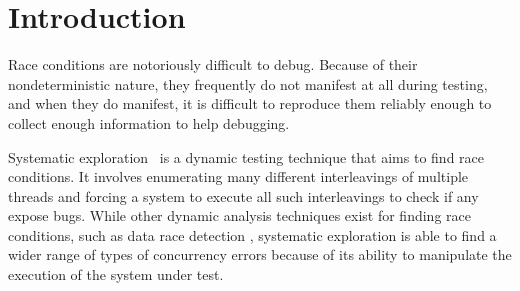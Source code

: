 \documentclass{llncs}
\begin{document}


\newcommand\squish{}

\squish
\section{Introduction}
\squish

Race conditions are notoriously difficult to debug.
Because of their nondeterministic nature, they frequently do not manifest at all during testing, and when they do manifest, it is difficult to reproduce them reliably enough to collect enough information to help debugging.

Systematic exploration~\cite{verisoft} is a dynamic testing technique that aims to find race conditions. It involves enumerating many different interleavings of multiple threads and forcing a system to execute all such interleavings to check if any expose bugs.
While other dynamic analysis techniques exist for finding race conditions, such as data race detection \cite{datacollider},
systematic exploration is able to find a wider range of types of concurrency errors because of its ability to manipulate the execution of the system under test.
\end{document}
